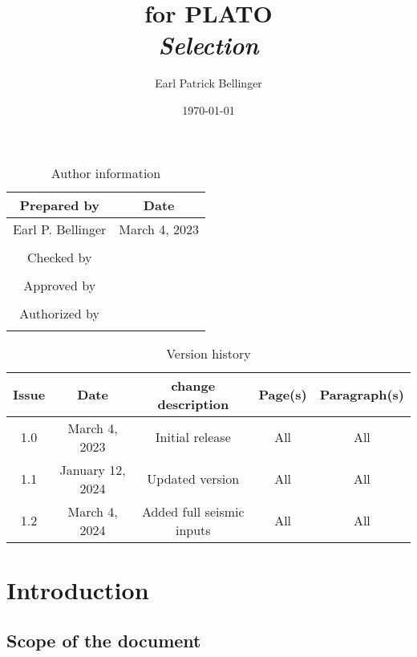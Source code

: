 \documentclass[a4paper, oneside, 11pt, article, english]{memoir}
\author{Earl Patrick Bellinger}
\title{\shorttitle{} for PLATO \\ \Large\textit{Selection}}
\date{\today}
\begin{document}
\maketitle

\begin{table}[htbp]
  \centering
  \caption{Author information}
  \label{tab:author}
  \begin{tabular}{cc}
    \toprule
    Prepared by & Date\\
    \midrule
    Earl P. Bellinger & March 4, 2023 \\
    \\
    Checked by \\
    \midrule
    \\
    Approved by \\
    \midrule
    \\
    Authorized by \\
    \midrule
    \\
    \bottomrule
  \end{tabular}
\end{table}

\begin{table}[htbp]
  \centering
  \caption{Version history}
  \label{tab:version}
  \begin{tabular}{ccccc}
    \toprule
    Issue & Date & \textnumero{} change description & Page(s) & Paragraph(s) \\
    \midrule
    1.0 & March 4, 2023 & Initial release & All & All \\
    1.1 & January 12, 2024 & Updated version & All & All \\
    1.2 & March 4, 2024 & Added full seismic inputs & All & All \\
    \bottomrule
  \end{tabular}
\end{table}


\clearpage
\tableofcontents*
\clearpage


\chapter{Introduction}
\label{chap:intro}

\section{Scope of the document}
\label{sec:scope}
\end{document}
